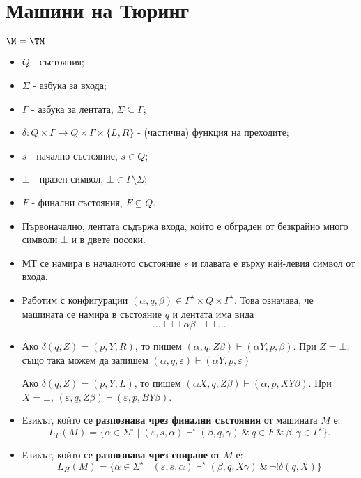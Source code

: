 \chapter{Машини на Тюринг}

\newcommand{\tape}[1]{\dots\bot\bot\bot{#1}\bot\bot\bot\dots}
$\M = \TM$

\begin{itemize}
\item 
  $Q$ - състояния;
\item
  $\Sigma$ - азбука за входа;
\item
  $\Gamma$ - азбука за лентата, $\Sigma \subseteq \Gamma$;
\item
  $\delta:Q\times\Gamma \to Q\times \Gamma \times \{L,R\}$ - (частична) функция на преходите;
\item
  $s$ - начално състояние, $s \in Q$;
\item
  $\bot$ - празен символ,  $\bot \in \Gamma \setminus \Sigma$;
\item
  $F$ - финални състояния, $F \subseteq Q$.
\end{itemize}

\begin{itemize}
\item 
  Първоначално, лентата съдържа входа, който е обграден от безкрайно много символи $\bot$ и в двете посоки.
\item
  МТ се намира в началното състояние $s$ и главата е върху най-левия символ от входа.
\item
  Работим с конфигурации $(\alpha, q, \beta) \in \Gamma^\star\times Q \times \Gamma^\star$. Това означава, че
  машината се намира в състояние $q$ и лентата има вида
  \[\tape{\alpha\beta}\]
\item
  Ако $\delta(q,Z) = (p,Y,R)$, то пишем
  $(\alpha, q, Z\beta) \vdash (\alpha Y, p, \beta)$.
  При $Z = \bot$, също така можем да запишем 
  $(\alpha, q, \varepsilon) \vdash (\alpha Y, p, \varepsilon)$

  Ако $\delta(q,Z) = (p,Y,L)$, то пишем
  $(\alpha X, q, Z\beta) \vdash (\alpha , p, XY\beta)$.
  При $X = \bot$, $(\varepsilon, q, Z\beta) \vdash (\varepsilon, p, BY\beta)$.
\item
  Езикът, който се {\bf разпознава чрез финални състояния} от машината $M$ е:
  \[L_F(M) = \{\alpha\in\Sigma^\star \mid (\varepsilon, s, \alpha) \vdash^\star (\beta, q, \gamma)\ \&\ q\in F\ \&\ \beta,\gamma\in\Gamma^\star\}.\]
\item
  Езикът, който се {\bf разпознава чрез спиране} от $M$ е:
  \[L_H(M) = \{\alpha \in \Sigma^\star \mid (\varepsilon, s, \alpha) \vdash^\star (\beta, q, X\gamma)\ \&\ \neg !\delta(q,X)\}\]
\end{itemize}

